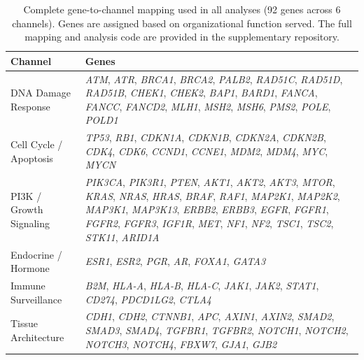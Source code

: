 \documentclass[11pt]{article}
\begin{document}
\begin{landscape}
\begin{table}[p]
\centering
\caption{Complete gene-to-channel mapping used in all analyses
(92 genes across 6 channels). Genes are assigned based on
organizational function served. The full mapping and analysis code
are provided in the supplementary repository.}
\label{tab:gene-mapping}
\begin{tabular}{@{}>{\raggedright}p{4.5cm}>{\raggedright\arraybackslash}p{18cm}@{}}
\toprule
\textbf{Channel} & \textbf{Genes} \\
\midrule
DNA Damage Response &
  \emph{ATM}, \emph{ATR}, \emph{BRCA1}, \emph{BRCA2}, \emph{PALB2},
  \emph{RAD51C}, \emph{RAD51D}, \emph{RAD51B}, \emph{CHEK1},
  \emph{CHEK2}, \emph{BAP1}, \emph{BARD1}, \emph{FANCA},
  \emph{FANCC}, \emph{FANCD2}, \emph{MLH1}, \emph{MSH2},
  \emph{MSH6}, \emph{PMS2}, \emph{POLE}, \emph{POLD1} \\[6pt]
Cell Cycle / Apoptosis &
  \emph{TP53}, \emph{RB1}, \emph{CDKN1A}, \emph{CDKN1B},
  \emph{CDKN2A}, \emph{CDKN2B}, \emph{CDK4}, \emph{CDK6},
  \emph{CCND1}, \emph{CCNE1}, \emph{MDM2}, \emph{MDM4},
  \emph{MYC}, \emph{MYCN} \\[6pt]
PI3K / Growth Signaling &
  \emph{PIK3CA}, \emph{PIK3R1}, \emph{PTEN}, \emph{AKT1},
  \emph{AKT2}, \emph{AKT3}, \emph{MTOR}, \emph{KRAS}, \emph{NRAS},
  \emph{HRAS}, \emph{BRAF}, \emph{RAF1}, \emph{MAP2K1},
  \emph{MAP2K2}, \emph{MAP3K1}, \emph{MAP3K13}, \emph{ERBB2},
  \emph{ERBB3}, \emph{EGFR}, \emph{FGFR1}, \emph{FGFR2},
  \emph{FGFR3}, \emph{IGF1R}, \emph{MET}, \emph{NF1}, \emph{NF2},
  \emph{TSC1}, \emph{TSC2}, \emph{STK11}, \emph{ARID1A} \\[6pt]
Endocrine / Hormone &
  \emph{ESR1}, \emph{ESR2}, \emph{PGR}, \emph{AR}, \emph{FOXA1},
  \emph{GATA3} \\[6pt]
Immune Surveillance &
  \emph{B2M}, \emph{HLA-A}, \emph{HLA-B}, \emph{HLA-C},
  \emph{JAK1}, \emph{JAK2}, \emph{STAT1}, \emph{CD274},
  \emph{PDCD1LG2}, \emph{CTLA4} \\[6pt]
Tissue Architecture &
  \emph{CDH1}, \emph{CDH2}, \emph{CTNNB1}, \emph{APC},
  \emph{AXIN1}, \emph{AXIN2}, \emph{SMAD2}, \emph{SMAD3},
  \emph{SMAD4}, \emph{TGFBR1}, \emph{TGFBR2}, \emph{NOTCH1},
  \emph{NOTCH2}, \emph{NOTCH3}, \emph{NOTCH4}, \emph{FBXW7},
  \emph{GJA1}, \emph{GJB2} \\
\bottomrule
\end{tabular}
\end{table}

\end{landscape}
\end{document}
